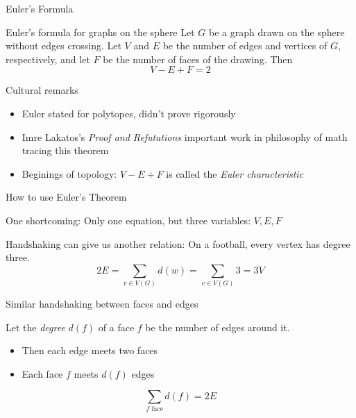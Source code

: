 \documentclass{beamer}
\begin{document}
\begin{frame}{Euler's Formula}
  \begin{theorem}{Euler's formula for graphs on the sphere}
    Let $G$ be a graph drawn on the sphere without edges crossing.  Let $V$ and $E$ be the number of edges and vertices of $G$, respectively, and let $F$ be the number of faces of the drawing.  Then
    $$V-E+F=2$$
    \end{theorem}

  \begin{block}{Cultural remarks}
    \begin{itemize}
    \item Euler stated for polytopes, didn't prove rigorously
    \item Imre Lakatos's \emph{Proof and Refutations} important work in philosophy of math tracing this theorem
    \item Beginings of topology: $V-E+F$ is called the \emph{Euler characteristic}
      \end{itemize}
    \end{block}

  
  \end{frame}
\begin{frame}{How to use Euler's Theorem}
  \begin{block}{One shortcoming:}
    Only one equation, but three variables: $V,E,F$
    \end{block}

  \begin{block}{Handshaking can give us another relation:}
    On a football, every vertex has degree three.
    $$2E=\sum_{v\in V(G)} d(w)=\sum_{v\in V(G)} 3=3V$$
  \end{block}

  \begin{block}{Similar handshaking between faces and edges}

    Let the \emph{degree} $d(f)$ of a face $f$ be the number of edges around it.
    \begin{itemize}
\item    Then each edge meets two faces 
\item    Each face $f$ meets $d(f)$ edges 
    \end{itemize}
    $$\sum_{f \text{ face}} d(f)=2E$$
\end{block}
    
  

  \end{frame}
\end{document}
